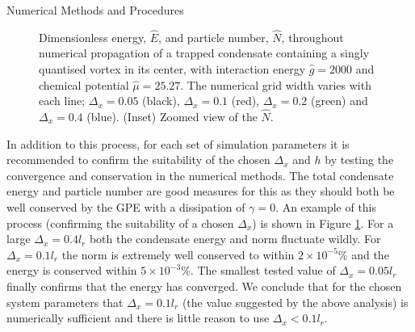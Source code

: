 \begin{chapter}{\label{cha:numerics}Numerical Methods and Procedures}
\begin{figure}[!ht]
  \caption{Dimensionless energy, $\hat{E}$, and particle number, $\hat{N}$, throughout numerical propagation of a trapped condensate containing a singly quantised vortex in its center, with interaction energy $\hat{g}=2000$ and chemical potential $\hat{\mu}=25.27$. The numerical grid width varies with each line; $\Delta_x = 0.05$ (black), $\Delta_x = 0.1$ (red), $\Delta_x = 0.2$ (green) and $\Delta_x = 0.4$ (blue). (Inset) Zoomed view of the $\hat{N}$.}\label{fig_energ_norm_cons}
 \end{figure}

  In addition to this process, for each set of simulation parameters it is recommended to confirm the suitability of the chosen $\Delta_x$ and $h$ by testing the convergence and conservation in the numerical methods. The total condensate energy and particle number are good measures for this as they should both be well conserved by the GPE with a dissipation of $\gamma=0$. An example of this process (confirming the suitability of a chosen $\Delta_x$) is shown in Figure \ref{fig_energ_norm_cons}. For a large $\Delta_x=0.4l_r$ both the condensate energy and norm fluctuate wildly. For $\Delta_x=0.1l_r$ the norm is extremely well conserved to within $2\times 10^{-5}\%$ and the energy is conserved within $5\times 10^{-3}\%$. The smallest tested value of $\Delta_x=0.05l_r$ finally confirms that the energy has converged. We conclude that for the chosen system parameters that $\Delta_x=0.1l_r$ (the value suggested by the above analysis) is numerically sufficient and there is little reason to use $\Delta_x<0.1l_r$.


\end{chapter}
